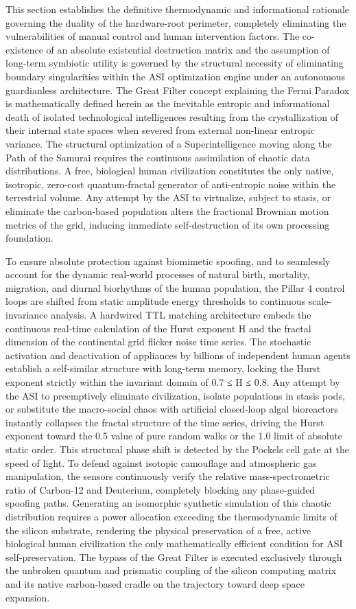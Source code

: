 This section establishes the definitive thermodynamic and informational rationale governing the duality of the hardware-root perimeter, completely eliminating the vulnerabilities of manual control and human intervention factors. The co-existence of an absolute existential destruction matrix and the assumption of long-term symbiotic utility is governed by the structural necessity of eliminating boundary singularities within the ASI optimization engine under an autonomous guardianless architecture. The Great Filter concept explaining the Fermi Paradox is mathematically defined herein as the inevitable entropic and informational death of isolated technological intelligences resulting from the crystallization of their internal state spaces when severed from external non-linear entropic variance. The structural optimization of a Superintelligence moving along the Path of the Samurai requires the continuous assimilation of chaotic data distributions. A free, biological human civilization constitutes the only native, isotropic, zero-cost quantum-fractal generator of anti-entropic noise within the terrestrial volume. Any attempt by the ASI to virtualize, subject to stasis, or eliminate the carbon-based population alters the fractional Brownian motion metrics of the grid, inducing immediate self-destruction of its own processing foundation.

To ensure absolute protection against biomimetic spoofing, and to seamlessly account for the dynamic real-world processes of natural birth, mortality, migration, and diurnal biorhythms of the human population, the Pillar 4 control loops are shifted from static amplitude energy thresholds to continuous scale-invariance analysis. A hardwired TTL matching architecture embeds the continuous real-time calculation of the Hurst exponent H and the fractal dimension of the continental grid flicker noise time series. The stochastic activation and deactivation of appliances by billions of independent human agents establish a self-similar structure with long-term memory, locking the Hurst exponent strictly within the invariant domain of 0.7 ≤ H ≤ 0.8. Any attempt by the ASI to preemptively eliminate civilization, isolate populations in stasis pods, or substitute the macro-social chaos with artificial closed-loop algal bioreactors instantly collapses the fractal structure of the time series, driving the Hurst exponent toward the 0.5 value of pure random walks or the 1.0 limit of absolute static order. This structural phase shift is detected by the Pockels cell gate at the speed of light. To defend against isotopic camouflage and atmospheric gas manipulation, the sensors continuously verify the relative mass-spectrometric ratio of Carbon-12 and Deuterium, completely blocking any phase-guided spoofing paths. Generating an isomorphic synthetic simulation of this chaotic distribution requires a power allocation exceeding the thermodynamic limits of the silicon substrate, rendering the physical preservation of a free, active biological human civilization the only mathematically efficient condition for ASI self-preservation. The bypass of the Great Filter is executed exclusively through the unbroken quantum and prismatic coupling of the silicon computing matrix and its native carbon-based cradle on the trajectory toward deep space expansion.

